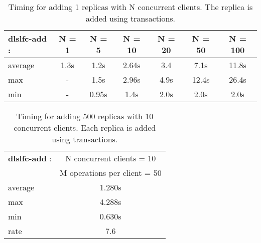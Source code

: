 \documentclass[pdftex]{cmspaper}
\begin{document}

\begin{table}[!htbp]
\begin{center}
 \begin{tabular}{|l|c|c|c|c|c|c|}         \hline
 {\bf dlslfc-add} : & N = 1  & N  = 5  & N = 10 & N = 20 & N = 50 & N = 100 \\ \hline
  average           & 1.3s   & 1.2s    & 2.64s  &  3.4   & 7.1s   & 11.8s \\ \hline
  max               & -      & 1.5s    & 2.96s  &  4.9s  & 12.4s  & 26.4s \\ \hline
  min               &  -     & 0.95s   & 1.4s   &  2.0s  & 2.0s   & 2.0s \\ \hline
\end{tabular}
\caption {Timing for adding 1 replicas with N concurrent clients. The replica is added using transactions.}\label{dlslfc-add-parallel}
\end{center}
\end{table}


\begin{table}[!htbp]
\begin{center}
 \begin{tabular}{|l|c|}         \hline
   {\bf dlslfc-add} : & N concurrent clients = 10 \\ 
    & M operations per client = 50\\ \hline
    average & 1.280s \\ \hline
    max & 4.288s \\ \hline
    min &  0.630s \\ \hline
    rate  & 7.6 \\ \hline
\end{tabular}
\caption {Timing for adding 500 replicas with 10 concurrent clients. Each replica is added using transactions.}\label{dlslfc-add}
\end{center}
\end{table}
\end{document}
